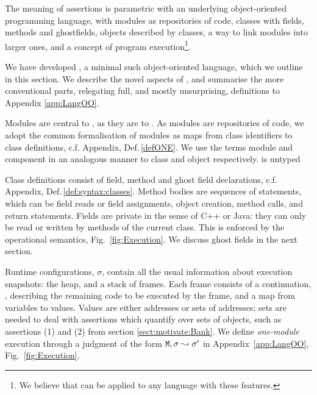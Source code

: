 \renewcommand{\appref}[1]{, c.f. Appendix, Def.\,\ref{#1}}
 
The meaning of \Chainmail assertions is parametric with an
underlying object-oriented programming language, with modules  as repositories of code, classes with fields, methods and
ghostfields, objects described by classes, a way to link  modules into larger ones, and a concept of 
program execution\footnote{We believe that \Chainmail can be applied to 
any language with these features.}.

We have developed   \LangOO, a  minimal such object-oriented language, which we
outline in  this section. 
We  describe the novel aspects of \LangOO, and 
summarise the more conventional parts, relegating  full, and mostly unsurprising,
definitions %
to Appendix \ref{app:LangOO}.
 

Modules are central to \LangOO, as they are to \Chainmail. As modules are repositories
of code, we adopt the common formalisation of modules as maps from 
class identifiers to class definitions\appref{defONE}. We use the terms module and component in an
analogous manner to class and object respectively.  \LangOO is untyped 

 Class definitions consist of field, method and ghost field declarations\appref{def:syntax:classes}.
Method bodies are sequences of 
statements, which  can be field reads or field assignments, object
creation, method calls, and return statements. 
Fields are private in the sense of C++ or Java: they can only be read or
written by methods of the current class.
This is enforced by the operational semantics, \cf Fig.~\ref{fig:Execution}.
We  discuss ghost fields in the next section.

Runtime configurations, $\sigma$,  contain   all the usual information about execution snapshots: the heap, and a
stack of frames. 
%
Each frame consists of a continuation, , describing the remaining code to be executed by the
frame, and a map from
variables to values. Values are either addresses or sets of addresses; sets 
are needed to deal with assertions which quantify over sets of
objects, such as assertions
(1) and (2) from section \ref{sect:motivate:Bank}.
% 
We define \emph{one-module} execution  through a judgment of the form ${\mbox{\tt{\ensuremath{{\mbox{\tt{M}}}}}}}, \sigma \leadsto \sigma'$ in Appendix~\ref{app:LangOO}, Fig.~\ref{fig:Execution}. 
%
  

